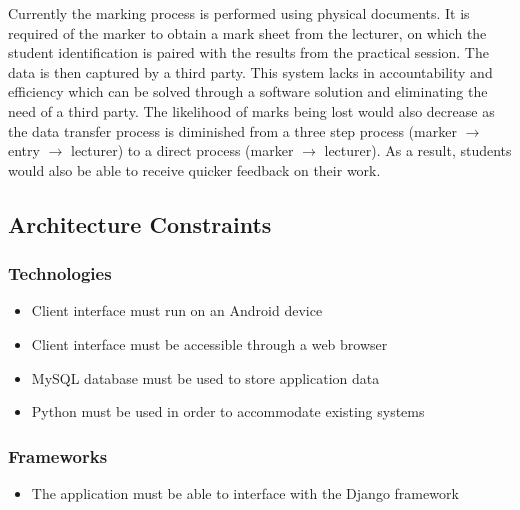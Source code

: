 \documentclass[a4paper]{article}
\begin{document}
		Currently the marking process is performed using physical documents. It is required of the marker to obtain a mark sheet from the lecturer, on which the student identification is paired with the results from the practical session. The data is then captured by a third party. This system lacks in accountability and efficiency which can be solved through a software solution and eliminating the need of a third party. The likelihood of marks being lost would also decrease as the data transfer process is diminished from a three step process (marker $\rightarrow$ entry $\rightarrow$ lecturer) to a direct process (marker $\rightarrow$ lecturer). As a result, students would also be able to receive quicker feedback on their work.

		

		\subsection{Architecture Constraints}
		
			\subsubsection{Technologies}
		
				\begin{itemize}

					\item{Client interface must run on an Android device}

					\item{Client interface must be accessible through a web browser}
					
					\item{MySQL database must be used to store application data}
					
					\item{Python must be used in order to accommodate existing systems}

				\end{itemize}
				
			\subsubsection{Frameworks}
			
				\begin{itemize}

					\item{The application must be able to interface with the Django framework}

				\end{itemize}
\end{document}

